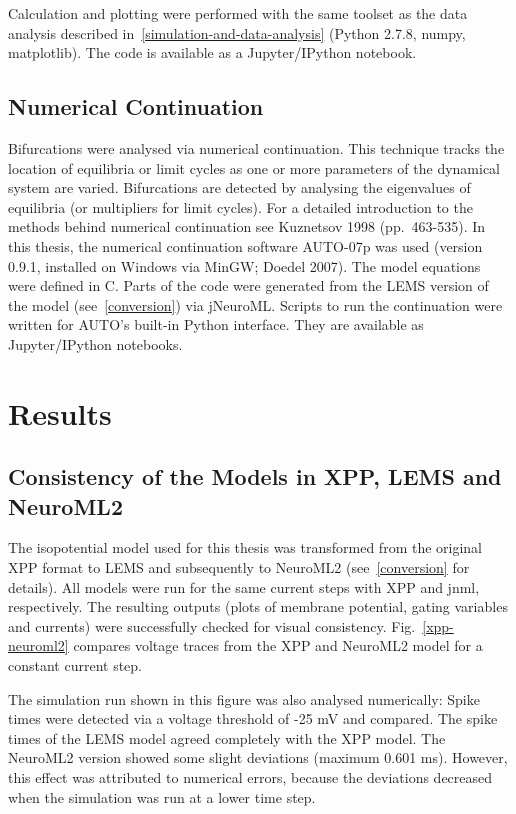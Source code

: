 \documentclass[12pt,a4paper,]{report}
\begin{document}
Calculation and plotting were performed with the same toolset as the
data analysis described in~\ref{simulation-and-data-analysis} (Python
2.7.8, numpy, matplotlib). The code is available as a Jupyter/IPython
notebook.

\section{Numerical Continuation}\label{numerical-continuation}

Bifurcations were analysed via numerical continuation. This technique
tracks the location of equilibria or limit cycles as one or more
parameters of the dynamical system are varied. Bifurcations are detected
by analysing the eigenvalues of equilibria (or multipliers for limit
cycles). For a detailed introduction to the methods behind numerical
continuation see Kuznetsov 1998 (pp.~463-535). In this thesis, the
numerical continuation software AUTO-07p was used (version 0.9.1,
installed on Windows via MinGW; Doedel 2007). The model equations were
defined in C. Parts of the code were generated from the LEMS version of
the model (see~\ref{conversion}) via jNeuroML. Scripts to run the
continuation were written for AUTO's built-in Python interface. They are
available as Jupyter/IPython notebooks.

\chapter{Results}\label{results}

\section{Consistency of the Models in XPP, LEMS and
NeuroML2}\label{consistency-of-models}

The isopotential model used for this thesis was transformed from the
original XPP format to LEMS and subsequently to NeuroML2
(see~\ref{conversion} for details). All models were run for the same
current steps with XPP and jnml, respectively. The resulting outputs
(plots of membrane potential, gating variables and currents) were
successfully checked for visual consistency. Fig.~\ref{xpp-neuroml2}
compares voltage traces from the XPP and NeuroML2 model for a constant
current step.

The simulation run shown in this figure was also analysed numerically:
Spike times were detected via a voltage threshold of -25 mV and
compared. The spike times of the LEMS model agreed completely with the
XPP model. The NeuroML2 version showed some slight deviations (maximum
0.601 ms). However, this effect was attributed to numerical errors,
because the deviations decreased when the simulation was run at a lower
time step.
\end{document}
